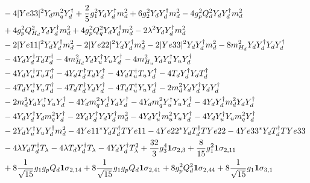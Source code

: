 \begin{align}
 &-4 |Ye33|^2 {Y_d  m_q^2  Y_{d}^{\dagger}} +\frac{2}{5} g_{1}^{2} {Y_d  Y_{d}^{\dagger}  m_d^2} +6 g_{2}^{2} {Y_d  Y_{d}^{\dagger}  m_d^2} -4 g_{p}^{2} Q_{d}^{2} {Y_d  Y_{d}^{\dagger}  m_d^2} \nonumber \\ 
 &+4 g_{p}^{2} Q_{H_d}^{2} {Y_d  Y_{d}^{\dagger}  m_d^2} +4 g_{p}^{2} Q_{q}^{2} {Y_d  Y_{d}^{\dagger}  m_d^2} -2 \lambda^{2} {Y_d  Y_{d}^{\dagger}  m_d^2} \nonumber \\ 
 &-2 |Ye11|^2 {Y_d  Y_{d}^{\dagger}  m_d^2} -2 |Ye22|^2 {Y_d  Y_{d}^{\dagger}  m_d^2} -2 |Ye33|^2 {Y_d  Y_{d}^{\dagger}  m_d^2} -8 m_{H_d}^2 {Y_d  Y_{d}^{\dagger}  Y_d  Y_{d}^{\dagger}} \nonumber \\ 
 &-4 {Y_d  Y_{d}^{\dagger}  T_d  T_{d}^{\dagger}} -4 m_{H_d}^2 {Y_d  Y_{u}^{\dagger}  Y_u  Y_{d}^{\dagger}} -4 m_{H_u}^2 {Y_d  Y_{u}^{\dagger}  Y_u  Y_{d}^{\dagger}} \nonumber \\ 
 &-4 {Y_d  Y_{u}^{\dagger}  T_u  T_{d}^{\dagger}} -4 {Y_d  T_{d}^{\dagger}  T_d  Y_{d}^{\dagger}} -4 {Y_d  T_{u}^{\dagger}  T_u  Y_{d}^{\dagger}} -4 {T_d  Y_{d}^{\dagger}  Y_d  T_{d}^{\dagger}} \nonumber \\ 
 &-4 {T_d  Y_{u}^{\dagger}  Y_u  T_{d}^{\dagger}} -4 {T_d  T_{d}^{\dagger}  Y_d  Y_{d}^{\dagger}} -4 {T_d  T_{u}^{\dagger}  Y_u  Y_{d}^{\dagger}} -2 {m_d^2  Y_d  Y_{d}^{\dagger}  Y_d  Y_{d}^{\dagger}} \nonumber \\ 
 &-2 {m_d^2  Y_d  Y_{u}^{\dagger}  Y_u  Y_{d}^{\dagger}} -4 {Y_d  m_q^2  Y_{d}^{\dagger}  Y_d  Y_{d}^{\dagger}} -4 {Y_d  m_q^2  Y_{u}^{\dagger}  Y_u  Y_{d}^{\dagger}} -4 {Y_d  Y_{d}^{\dagger}  m_d^2  Y_d  Y_{d}^{\dagger}} \nonumber \\ 
 &-4 {Y_d  Y_{d}^{\dagger}  Y_d  m_q^2  Y_{d}^{\dagger}} -2 {Y_d  Y_{d}^{\dagger}  Y_d  Y_{d}^{\dagger}  m_d^2} -4 {Y_d  Y_{u}^{\dagger}  m_u^2  Y_u  Y_{d}^{\dagger}} -4 {Y_d  Y_{u}^{\dagger}  Y_u  m_q^2  Y_{d}^{\dagger}} \nonumber \\ 
 &-2 {Y_d  Y_{u}^{\dagger}  Y_u  Y_{d}^{\dagger}  m_d^2} -4 Ye11^* {Y_d  T_{d}^{\dagger}} TYe11 -4 Ye22^* {Y_d  T_{d}^{\dagger}} TYe22 -4 Ye33^* {Y_d  T_{d}^{\dagger}} TYe33 \nonumber \\ 
 &-4 \lambda {Y_d  T_{d}^{\dagger}} T_{\lambda} -4 \lambda {T_d  Y_{d}^{\dagger}} T_{\lambda} -4 {Y_d  Y_{d}^{\dagger}} T_{\lambda}^{2} +\frac{32}{3} g_{3}^{4} {\bf 1} \sigma_{2,3} +\frac{8}{15} g_{1}^{2} {\bf 1} \sigma_{2,11} \nonumber \\ 
 &+8 \frac{1}{\sqrt{15}} g_1 g_p Q_{d} {\bf 1} \sigma_{2,14} +8 \frac{1}{\sqrt{15}} g_1 g_p Q_{d} {\bf 1} \sigma_{2,41} +8 g_{p}^{2} Q_{d}^{2} {\bf 1} \sigma_{2,44} +8 \frac{1}{\sqrt{15}} g_1 {\bf 1} \sigma_{3,1} \nonumber \\ 

\end{align}
